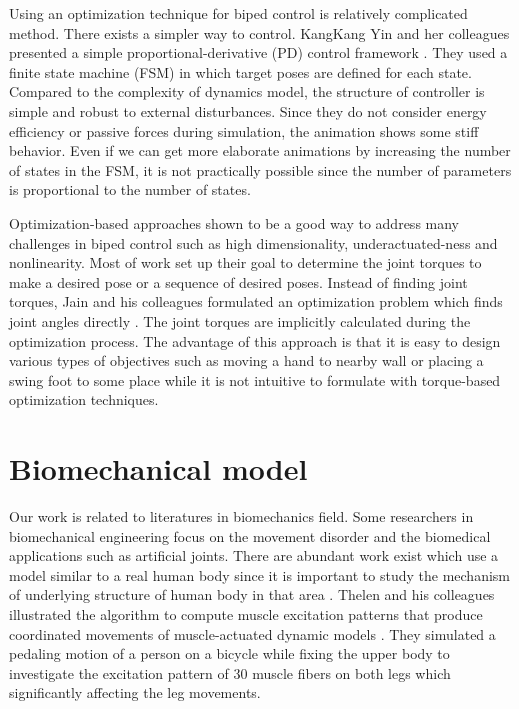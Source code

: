 \documentclass[master,english,final]{kaist-ucs}
\begin{document}
Using an optimization technique for biped control is relatively complicated method.
There exists a simpler way to control. KangKang Yin and her colleagues
presented a simple proportional-derivative (PD) control framework \cite{journals/tog/YinLP07}.
They used a finite state machine (FSM) in which target poses are defined
for each state. Compared to the complexity of dynamics model,
the structure of controller is simple and robust to external disturbances.
Since they do not consider energy efficiency or passive forces during
simulation, the animation shows some stiff behavior.
Even if we can get more elaborate animations by increasing
the number of states in the FSM, it is not practically possible since the
number of parameters is proportional to the number of states.

Optimization-based approaches shown to be a good way to address many challenges
in biped control such as high dimensionality, underactuated-ness and
nonlinearity. Most of work set up their goal to determine the joint
torques to make a desired pose or a sequence of desired poses.
Instead of finding joint torques, Jain and his colleagues formulated
an optimization problem which finds joint angles directly \cite{Jain:09:OIM}. The joint torques
are implicitly calculated during the optimization process. The advantage of
this approach is that it is easy to design various types of objectives such as
moving a hand to nearby wall or placing a swing foot to some place while it
is not intuitive to formulate with torque-based optimization techniques.

\section{Biomechanical model}

Our work is related to literatures in biomechanics field.
Some researchers in biomechanical engineering focus on the movement
disorder and the biomedical applications such as artificial joints.
There are abundant work exist which use a model similar to
a real human body since it is important to study the mechanism of underlying
structure of human body in that area \cite{vr-305}. Thelen and his colleagues
illustrated
the algorithm to compute muscle excitation patterns that produce
coordinated movements of muscle-actuated dynamic models \cite{Thelen2003321}.
They simulated
a pedaling motion of a person on a bicycle while fixing the upper body to investigate the excitation
pattern of 30 muscle fibers on both legs which significantly affecting the leg movements.
\end{document}
